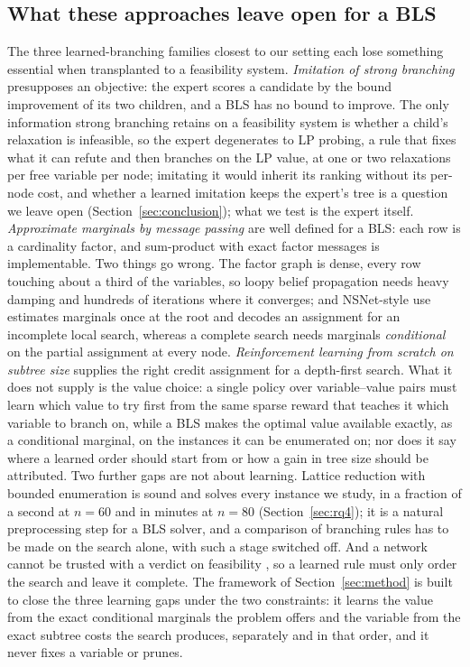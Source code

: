 \documentclass[final,5p,times,twocolumn,authoryear]{elsarticle}
\begin{document}
\subsection{What these approaches leave open for a BLS}
The three learned-branching families closest to our setting each lose something essential when transplanted to a feasibility system.
\emph{Imitation of strong branching} \citep{khalil2016learning,gasse2019exact} presupposes an objective: the expert scores a candidate by the bound improvement of its two children, and a BLS has no bound to improve. The only information strong branching retains on a feasibility system is whether a child's relaxation is infeasible, so the expert degenerates to LP probing, a rule that fixes what it can refute and then branches on the LP value, at one or two relaxations per free variable per node; imitating it would inherit its ranking without its per-node cost, and whether a learned imitation keeps the expert's tree is a question we leave open (Section~\ref{sec:conclusion}); what we test is the expert itself.
\emph{Approximate marginals by message passing} \citep{li2022nsnet,montanari2007solving} are well defined for a BLS: each row is a cardinality factor, and sum-product with exact factor messages is implementable. Two things go wrong. The factor graph is dense, every row touching about a third of the variables, so loopy belief propagation needs heavy damping and hundreds of iterations where it converges; and NSNet-style use estimates marginals once at the root and decodes an assignment for an incomplete local search, whereas a complete search needs marginals \emph{conditional} on the partial assignment at every node.
\emph{Reinforcement learning from scratch on subtree size} \citep{etheve2020reinforcement,scavuzzo2022learning} supplies the right credit assignment for a depth-first search. What it does not supply is the value choice: a single policy over variable--value pairs must learn which value to try first from the same sparse reward that teaches it which variable to branch on, while a BLS makes the optimal value available exactly, as a conditional marginal, on the instances it can be enumerated on; nor does it say where a learned order should start from or how a gain in tree size should be attributed.
Two further gaps are not about learning. Lattice reduction with bounded enumeration \citep{aardal2000market,wassermann2025solving} is sound and solves every instance we study, in a fraction of a second at $n=60$ and in minutes at $n=80$ (Section~\ref{sec:rq4}); it is a natural preprocessing step for a BLS solver, and a comparison of branching rules has to be made on the search alone, with such a stage switched off. And a network cannot be trusted with a verdict on feasibility \citep{selsam2019neurosat,chen2023representing}, so a learned rule must only order the search and leave it complete.
The framework of Section~\ref{sec:method} is built to close the three learning gaps under the two constraints: it learns the value from the exact conditional marginals the problem offers and the variable from the exact subtree costs the search produces, separately and in that order, and it never fixes a variable or prunes.
\end{document}
